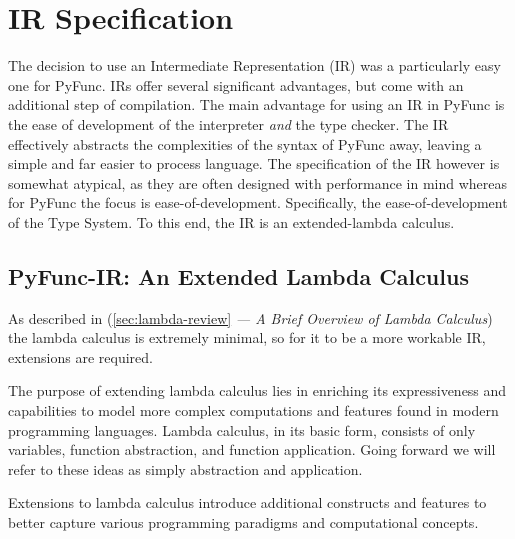 \documentclass{l4proj}
\begin{document}
\section{IR Specification}
\label{sec:ir-specification}
The decision to use an Intermediate Representation (IR) was a particularly easy one for PyFunc.
IRs offer several significant advantages, but come with an additional step of compilation.
The main advantage for using an IR in PyFunc is the ease of development of the interpreter \emph{and} the type checker.
The IR effectively abstracts the complexities of the syntax of PyFunc away, leaving a simple and far easier to process language.
The specification of the IR however is somewhat atypical, as they are often designed with performance in mind whereas for PyFunc the focus is ease-of-development.
Specifically, the ease-of-development of the Type System.
To this end, the IR is an extended-lambda calculus.

\subsection{PyFunc-IR: An Extended Lambda Calculus}
\label{sec:pyfunc-ir-an-extended-lambda-calculus}
As described in (\ref{sec:lambda-review} \emph{— A Brief Overview of Lambda Calculus}) the lambda calculus is extremely minimal, so for it to be a more workable IR, extensions are required.

The purpose of extending lambda calculus lies in enriching its expressiveness and capabilities to model more complex computations and features found in modern programming languages.
Lambda calculus, in its basic form, consists of only variables, function abstraction, and function application.
Going forward we will refer to these ideas as simply abstraction and application.

Extensions to lambda calculus introduce additional constructs and features to better capture various programming paradigms and computational concepts.
\end{document}
